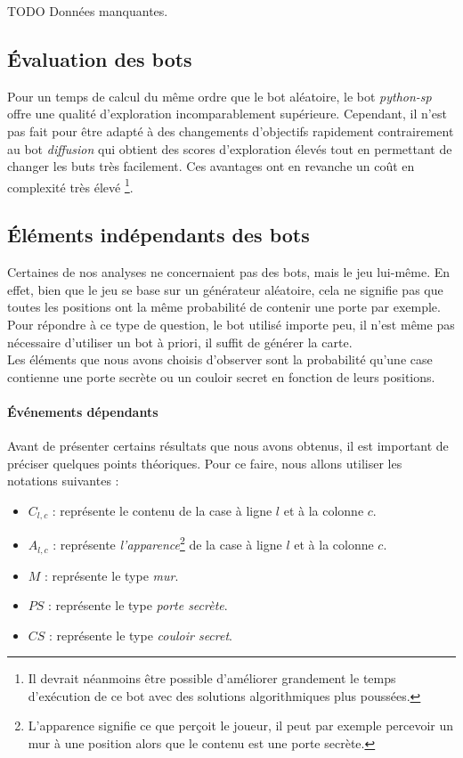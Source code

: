 \documentclass[a4paper,12pt]{article}
\begin{document}
TODO Données manquantes.

\subsection{Évaluation des bots}
Pour un temps de calcul du même ordre que le bot aléatoire, le bot
{\em python-sp} offre une qualité d'exploration incomparablement supérieure.
Cependant, il n'est pas fait pour être adapté à des changements d'objectifs
rapidement contrairement au bot {\em diffusion} qui obtient des scores
d'exploration élevés tout en permettant de changer les buts très facilement. Ces
avantages ont en revanche un coût en complexité très élevé \footnote{ Il devrait
néanmoins être possible d'améliorer grandement le temps d'exécution de ce bot
avec des solutions algorithmiques plus poussées.}.

\subsection{Éléments indépendants des bots}
Certaines de nos analyses ne concernaient pas des bots, mais le jeu lui-même. En
effet, bien que le jeu se base sur un générateur aléatoire, cela ne signifie pas
que toutes les positions ont la même probabilité de contenir une porte par
exemple. Pour répondre à ce type de question, le bot utilisé importe peu, il
n'est même pas nécessaire d'utiliser un bot à priori, il suffit de générer la
carte.
\\
Les éléments que nous avons choisis d'observer sont la probabilité qu'une case
contienne une porte secrète ou un couloir secret en fonction de leurs positions.

\paragraph{Événements dépendants}
Avant de présenter certains résultats que nous avons obtenus, il est important
de préciser quelques points théoriques. Pour ce faire, nous allons utiliser les
notations suivantes :
\begin{itemize}
\item $C_{l,c}$ :
  représente le contenu de la case à ligne $l$ et à la colonne $c$.
\item $A_{l,c}$ :
  représente {\em l'apparence}\footnote{L'apparence signifie ce que perçoit le
    joueur, il peut par exemple percevoir un mur à une position alors que le
    contenu est une porte secrète.} de la case à ligne $l$ et à la colonne $c$.
\item $M$ :
  représente le type {\em mur}.
\item $PS$ :
  représente le type {\em porte secrète}.
\item $CS$ :
  représente le type {\em couloir secret}.
\end{itemize}
\end{document}
